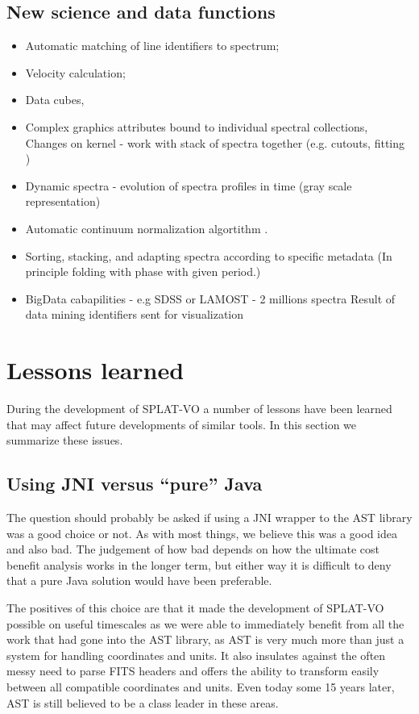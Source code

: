 \documentclass[final,authoryear,5p,times,twocolumn]{elsarticle}
\begin{document}
\subsection{New science and data functions}
\begin{itemize}
\item Automatic matching of line identifiers to spectrum;
\item	Velocity calculation;
\item Data cubes,
\item Complex graphics attributes bound to individual spectral collections, Changes on kernel - work with stack of spectra together (e.g. cutouts, fitting )
\item Dynamic spectra - evolution of spectra profiles in time (gray scale representation)
\item Automatic continuum normalization algortithm .
\item Sorting, stacking, and adapting spectra according to specific metadata (In principle folding with phase with given period.)
\item BigData cabapilities - e.g SDSS or LAMOST - 2 millions spectra Result of data mining identifiers sent for visualization
\end{itemize}

\section{Lessons learned}

During the development of SPLAT-VO a number of lessons have been
learned that may affect future developments of similar tools. In this
section we summarize these issues.

\subsection{Using JNI versus ``pure'' Java}

The question should probably be asked if using a JNI wrapper to the
AST library was a good choice or not. As with most things, we believe
this was a good idea and also bad. The judgement of how bad depends on
how the ultimate cost benefit analysis works in the longer term, but
either way it is difficult to deny that a pure Java solution would
have been preferable.

The positives of this choice are that it made the development of
SPLAT-VO possible on useful timescales as we were able to immediately
benefit from all the work that had gone into the AST library, as AST
is very much more than just a system for handling coordinates and
units. It also insulates against the often messy need to parse FITS
headers and offers the ability to transform easily between all
compatible coordinates and units. Even today some 15 years later, AST
is still believed to be a class leader in these areas.
\end{document}
